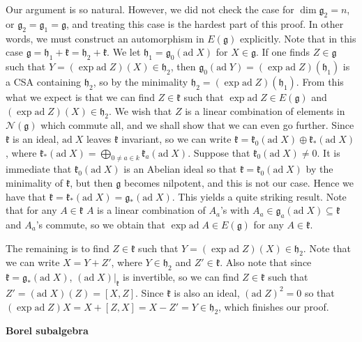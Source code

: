 \documentclass{article}
\newcommand{\lie}[1]{\mathfrak{#1}}
\newcommand{\ad}[1]{\mathrm{ad}\; #1}
\begin{document}
Our argument is so natural.
However, we did not check the case for $\dim{\lie{g}_2} = n$, or $\lie{g}_2 = \lie{g}_1 = \lie{g}$, and treating this case is the hardest part of this proof.
In other words, we must construct an automorphism in $E(\lie{g})$ explicitly.
Note that in this case $\lie{g} = \lie{h}_1 + \lie{k} = \lie{h}_2 + \lie{k}$.
We let $\lie{h}_1 = \lie{g}_0(\ad{X})$ for $X \in \lie{g}$.
If one finds $Z \in \lie{g}$ such that $Y = (\exp{\ad{Z}})(X) \in \lie{h}_2$, then $\lie{g}_0(\ad{Y}) = (\exp{\ad{Z}})(\lie{h_1})$ is a CSA containing $\lie{h}_2$, so by the minimality $\lie{h}_2 = (\exp{\ad{Z}})(\lie{h}_1)$.
From this what we expect is that we can find $Z \in \lie{k}$ such that $\exp{\ad{Z}} \in E(\lie{g})$ and $(\exp{\ad{Z}})(X) \in \lie{h}_2$.
We wish that $Z$ is a linear combination of elements in $\mathcal{N}(\lie{g})$ which commute all, and we shall show that we can even go further.
Since $\lie{k}$ is an ideal, $\ad{X}$ leaves $\lie{k}$ invariant, so we can write $\lie{k} = \lie{k}_0(\ad{X}) \oplus \lie{k}_*(\ad{X})$, where $\lie{k}_*(\ad{X}) = \bigoplus_{0 \ne a \in k} \lie{k}_a(\ad{X})$.
Suppose that $\lie{k}_0(\ad{X}) \ne 0$.
It is immediate that $\lie{k}_0(\ad{X})$ is an Abelian ideal so that $\lie{k} = \lie{k}_0(\ad{X})$ by the minimality of $\lie{k}$, but then $\lie{g}$ becomes nilpotent, and this is not our case.
Hence we have that $\lie{k} = \lie{k}_*(\ad{X}) = \lie{g}_*(\ad{X})$.
This yields a quite striking result.
Note that for any $A \in \lie{k}$ $A$ is a linear combination of $A_a$'s with $A_a \in \lie{g}_a(\ad{X}) \subseteq \lie{k}$ and $A_a$'s commute, so we obtain that $\exp{\ad{A}} \in E(\lie{g})$ for any $A \in \lie{k}$.

The remaining is to find $Z \in \lie{k}$ such that $Y = (\exp{\ad{Z}})(X) \in \lie{h}_2$.
Note that we can write $X = Y + Z'$, where $Y \in \lie{h}_2$ and $Z' \in \lie{k}$.
Also note that since $\lie{k} = \lie{g}_*(\ad{X})$, $(\ad{X})|_\lie{k}$ is invertible, so we can find $Z \in \lie{k}$ such that $Z' = (\ad{X})(Z) = [X, Z]$.
Since $\lie{k}$ is also an ideal, $(\ad{Z})^2 = 0$ so that $(\exp{\ad{Z}})X = X + [Z, X] = X - Z' = Y \in \lie{h}_2$, which finishes our proof.

\newpage

\textbf{Borel subalgebra}
\end{document}
